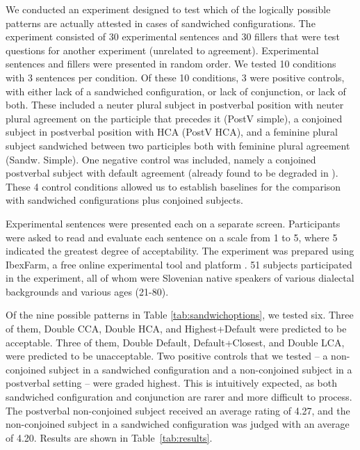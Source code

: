 \documentclass[output=paper
,modfonts
,nonflat]{langsci/langscibook}
\begin{document}
We conducted an experiment designed to test which of the logically possible patterns are actually attested in cases of sandwiched configurations. The experiment consisted of 30 experimental sentences and 30 fillers that were test questions for another experiment (unrelated to agreement). Experimental sentences and fillers were presented in random order. We tested 10 conditions with 3 sentences per condition. Of these 10 conditions, 3 were positive controls, with either lack of a sandwiched configuration, or lack of conjunction, or lack of both. These included a neuter plural subject in postverbal position with neuter plural agreement on the participle that precedes it (PostV simple), a conjoined subject in postverbal position with HCA (PostV HCA), and a feminine plural subject sandwiched between two participles both with feminine plural agreement (Sandw. Simple). One negative control was included, namely a conjoined postverbal subject with default agreement (already found to be degraded in \citealt{willergold:16}). These 4 control conditions allowed us to establish baselines for the comparison with sandwiched configurations plus conjoined subjects. 

Experimental sentences were presented each on a separate screen. Participants were asked to read and evaluate each sentence on a scale from 1 to 5, where 5 indicated the greatest degree of acceptability. The experiment was prepared using IbexFarm, a free online experimental tool and platform \citep{drummond:ibex}. 51 subjects participated in the experiment, all of whom were Slovenian native speakers of various dialectal backgrounds and various ages (21-80).

Of the nine possible patterns in Table \ref{tab:sandwichoptions}, we tested six. Three of them, Double CCA, Double HCA, and Highest+Default were predicted to be acceptable. Three of them, Double Default, Default+Closest, and Double LCA, were predicted to be unacceptable. Two positive controls that we tested -- a non-conjoined subject in a sandwiched configuration and a non-conjoined subject in a postverbal setting -- were graded highest. This is intuitively expected, as both sandwiched configuration and conjunction are rarer and more difficult to process. The postverbal non-conjoined subject received an average rating of 4.27, and the non-conjoined subject in a sandwiched configuration was judged with an average of 4.20. Results are shown in Table~\ref{tab:results}.
\end{document}

